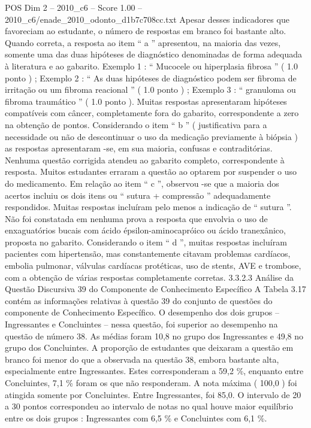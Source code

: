 \begin{textsample}{POS Dim 2 – 2010\_c6 – Score 1.00 – 2010\_c6/enade\_2010\_odonto\_d1b7c708cc.txt}
Apesar desses indicadores que favoreciam ao estudante, o número de respostas em branco foi bastante alto.
Quando correta, a resposta ao item “ a ” apresentou, na maioria das vezes, somente uma das duas hipóteses de diagnóstico denominadas de forma adequada à literatura e ao gabarito.
Exemplo 1 : “ Mucocele ou hiperplasia fibrosa ” ( 1.0 ponto ) ; Exemplo 2 : “ As duas hipóteses de diagnóstico podem ser fibroma de irritação ou um fibroma reacional ” ( 1.0 ponto ) ; Exemplo 3 : “ granuloma ou fibroma traumático ” ( 1.0 ponto ).
Muitas respostas apresentaram hipóteses compatíveis com câncer, completamente fora do gabarito, correspondente a zero na obtenção de pontos.
Considerando o item “ b ” ( justificativa para a necessidade ou não de descontinuar o uso da medicação previamente à biópsia ) as respostas apresentaram -se, em sua maioria, confusas e contraditórias.
Nenhuma questão corrigida atendeu ao gabarito completo, correspondente à resposta.
Muitos estudantes erraram a questão ao optarem por suspender o uso do medicamento.
Em relação ao item “ c ”, observou -se que a maioria dos acertos incluiu os dois itens ou “ sutura + compressão ” adequadamente respondidos.
Muitas respostas incluíram pelo menos a indicação de “ sutura ”.
Não foi constatada em nenhuma prova a resposta que envolvia o uso de enxaguatórios bucais com ácido épsilon-aminocapróico ou ácido tranexânico, proposta no gabarito.
Considerando o item “ d ”, muitas respostas incluíram pacientes com hipertensão, mas constantemente citavam problemas cardíacos, embolia pulmonar, válvulas cardíacas protéticas, uso de stents, AVE e trombose, com a obtenção de várias respostas completamente corretas. 3.3.2.3 Análise da Questão Discursiva 39 do Componente de Conhecimento Específico A Tabela 3.17 contém as informações relativas à questão 39 do conjunto de questões do componente de Conhecimento Específico.
O desempenho dos dois grupos – Ingressantes e Concluintes – nessa questão, foi superior ao desempenho na questão de número 38.
As médias foram 10,8 no grupo dos Ingressantes e 49,8 no grupo dos Concluintes.
A proporção de estudantes que deixaram a questão em branco foi menor do que a observada na questão 38, embora bastante alta, especialmente entre Ingressantes.
Estes corresponderam a 59,2 \%, enquanto entre Concluintes, 7,1 \% foram os que não responderam.
A nota máxima ( 100,0 ) foi atingida somente por Concluintes.
Entre Ingressantes, foi 85,0.
O intervalo de 20 a 30 pontos correspondeu ao intervalo de notas no qual houve maior equilíbrio entre os dois grupos : Ingressantes com 6,5 \% e Concluintes com 6,1 \%.

\end{textsample}
